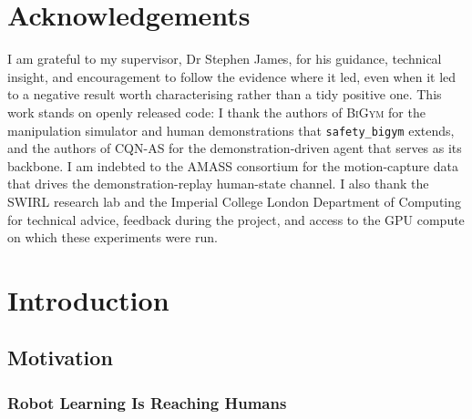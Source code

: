 \documentclass[11pt,a4paper]{report}
\newcommand{\bigym}{\textsc{BiGym}}
\newcommand{\sbigym}{\texttt{safety\_bigym}}
\newcommand{\cqnas}{CQN-AS}
\begin{document}
\tableofcontents
\listoffigures
\listoftables

\chapter*{Acknowledgements}
I am grateful to my supervisor, Dr Stephen James, for his guidance,
technical insight, and encouragement to follow the evidence where it
led, even when it led to a negative result worth characterising rather
than a tidy positive one. This work stands on openly released code: I
thank the authors of \bigym{} for the manipulation simulator and human
demonstrations that \sbigym{} extends, and the authors of \cqnas{} for
the demonstration-driven agent that serves as its backbone. I am
indebted to the \textsc{AMASS} consortium for the motion-capture data
that drives the demonstration-replay human-state channel. I also thank
the SWIRL research lab and the Imperial College London Department of
Computing for technical advice, feedback during the project, and access
to the GPU compute on which these experiments were run.

\chapter{Introduction}
\label{ch:intro}

\section{Motivation}
\label{sec:intro:motivation}

\subsection{Robot Learning Is Reaching Humans}
\label{sec:intro:mot:reaching}
\end{document}
